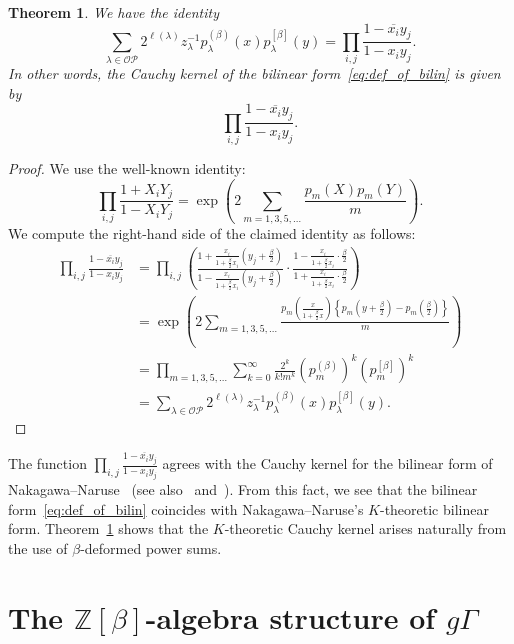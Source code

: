 \documentclass[dvipdfmx]{amsart}
\newtheorem{thm}{Theorem}[section]
\theoremstyle{definition}
\theoremstyle{remark}
\begin{document}
\begin{thm}\label{thm:cauthyK}
We have the identity
\[
\sum_{\lambda \in \mathcal{OP}} 2^{\ell(\lambda)} z_\lambda^{-1} 
p_\lambda^{(\beta)}(x) p_\lambda^{[\beta]}(y) 
= \prod_{i,j} \frac{1 - \overline{x_i} y_j}{1 - x_i y_j}.
\]
In other words, the Cauchy kernel of the bilinear form~\eqref{eq:def_of_bilin} is given by 
\begin{equation}\label{eq:K-cauchy}
\prod_{i,j} \frac{1 - \overline{x_i} y_j}{1 - x_i y_j}.
\end{equation}
\end{thm}

\begin{proof}
We use the well-known identity:
\[
\prod_{i,j} \frac{1 + X_i Y_j}{1 - X_i Y_j}
= \exp\left( 2 \sum_{m=1,3,5,\dots} \frac{p_m(X) p_m(Y)}{m} \right).
\]
We compute the right-hand side of the claimed identity as follows:
\[
\begin{aligned}
\prod_{i,j} \frac{1 - \overline{x_i} y_j}{1 - x_i y_j}
&=
\prod_{i,j}
\left(
\frac{1 + \frac{x_i}{1 + \frac{\beta}{2} x_i}(y_j + \tfrac{\beta}{2})}
     {1 - \frac{x_i}{1 + \frac{\beta}{2} x_i}(y_j + \tfrac{\beta}{2})}
\cdot
\frac{1 - \frac{x_i}{1 + \frac{\beta}{2} x_i} \cdot \frac{\beta}{2}}
     {1 + \frac{x_i}{1 + \frac{\beta}{2} x_i} \cdot \frac{\beta}{2}}
\right) \\
&=
\exp\left( 
2 \sum_{m=1,3,5,\dots} \frac{
p_m\left( \frac{x}{1 + \frac{\beta}{2} x} \right)
\left\{ p_m(y + \tfrac{\beta}{2}) - p_m(\tfrac{\beta}{2}) \right\}
}{m}
\right) \\
&=
\prod_{m=1,3,5,\dots} \sum_{k=0}^\infty 
\frac{2^k}{k! m^k} 
(p_m^{(\beta)})^k (p_m^{[\beta]})^k \\
&=
\sum_{\lambda \in \mathcal{OP}} 
2^{\ell(\lambda)} z_\lambda^{-1} 
p_\lambda^{(\beta)}(x) p_\lambda^{[\beta]}(y).
\end{aligned}
\]
\end{proof}

The function \( \prod_{i,j} \frac{1 - \overline{x_i} y_j}{1 - x_i y_j} \) agrees with the Cauchy kernel for the bilinear form of Nakagawa–Naruse~\cite[\S 6.2]{nakagawa2017generating} 
(see also~\cite[Definition 1.2]{LwMarberg2024} and~\cite[Equation (1)]{iwao2023}).
From this fact, we see that the bilinear form~\eqref{eq:def_of_bilin} coincides with Nakagawa–Naruse's \( K \)-theoretic bilinear form.  
Theorem~\ref{thm:cauthyK} shows that the \( K \)-theoretic Cauchy kernel arises naturally from the use of \( \beta \)-deformed power sums.

\section{The \( \mathbb{Z}[\beta] \)-algebra structure of \( g\Gamma \)}\label{eq:z-str_of_gGamma}
\end{document}
